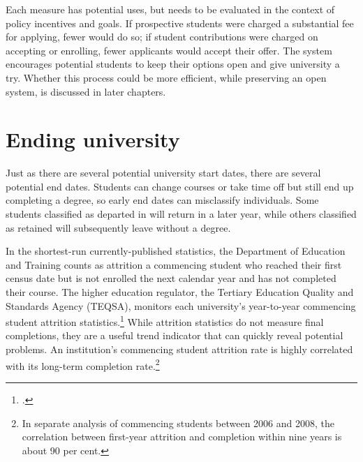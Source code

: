 Each measure has potential uses, but needs to be evaluated in the context of policy incentives and goals. If prospective students were charged a substantial fee for applying, fewer would do so; if student contributions were charged on accepting or enrolling, fewer applicants would accept their offer. The system encourages potential students to keep their options open and give university a try. Whether this process could be more efficient, while preserving an open system, is discussed in later chapters.


\section{ Ending university}\label{sec:1.2}

Just as there are several potential university start dates, there are several potential end dates. Students can change courses or take time off but still end up completing a degree, so early end dates can misclassify individuals. Some students classified as departed in  will return in a later year, while others classified as retained will subsequently leave without a degree.

In the shortest-run currently-published statistics, the Department of Education and Training counts as attrition a commencing student who reached their first census date but is not enrolled the next calendar year and has not completed their course. The higher education regulator, the Tertiary Education Quality and Standards Agency (TEQSA), monitors each university's year-to-year commencing student attrition statistics.\footcite[][]{TEQSA2016e} 
While attrition statistics do not measure final completions, they are a useful trend indicator that can quickly reveal potential problems. An institution's commencing student attrition rate is highly correlated with its long-term completion rate.\footnote{In separate analysis of commencing students between 2006 and 2008, the correlation between first-year attrition and completion within nine years is about 90 per cent.}


